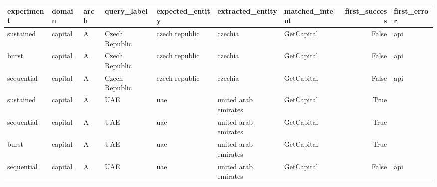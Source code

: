 \begin{tabular}{lllllllrl}
\toprule
experiment & domain & arch & query_label & expected_entity & extracted_entity & matched_intent & first_success & first_error \\
\midrule
sustained & capital & A & Czech Republic & czech republic & czechia & GetCapital & False & api \\
burst & capital & A & Czech Republic & czech republic & czechia & GetCapital & False & api \\
sequential & capital & A & Czech Republic & czech republic & czechia & GetCapital & False & api \\
sustained & capital & A & UAE & uae & united arab emirates & GetCapital & True &  \\
sequential & capital & A & UAE & uae & united arab emirates & GetCapital & True &  \\
burst & capital & A & UAE & uae & united arab emirates & GetCapital & True &  \\
sequential & capital & A & UAE & uae & united arab emirates & GetCapital & False & api \\
\bottomrule
\end{tabular}
